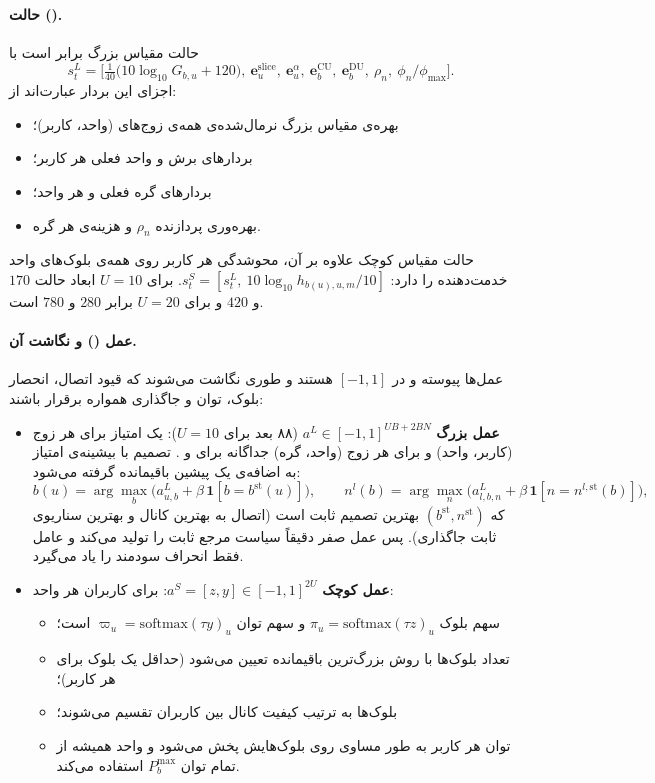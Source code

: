 \documentclass[12pt,oneside]{report}
\begin{document}
\paragraph{حالت ().}
حالت مقیاس بزرگ برابر است با
\begin{equation}\label{eq:sL}
	s^L_t=\Big[\tfrac{1}{40}\big(10\log_{10}G_{b,u}+120\big),\ \mathbf e^{\text{slice}}_u,\ \mathbf e^{\alpha}_u,\ \mathbf e^{\mathrm{CU}}_b,\ \mathbf e^{\mathrm{DU}}_b,\ \rho_n,\ \phi_n/\phi_{\max}\Big].
\end{equation}
اجزای این بردار عبارت‌اند از:
\begin{itemize}
	\item بهره‌ی مقیاس بزرگ نرمال‌شده‌ی همه‌ی زوج‌های (واحد، کاربر)؛
	\item بردارهای  برش و واحد فعلی هر کاربر؛
	\item بردارهای  گره فعلی  و  هر واحد؛
	\item بهره‌وری پردازنده $\rho_n$ و هزینه‌ی هر گره.
\end{itemize}
حالت مقیاس کوچک علاوه بر آن، محوشدگی هر کاربر روی همه‌ی بلوک‌های واحد خدمت‌دهنده را دارد: $s^S_t=[s^L_t,\ 10\log_{10}h_{b(u),u,m}/10]$. برای $U=10$ ابعاد حالت $170$ و $420$ و برای $U=20$ برابر $280$ و $780$ است.

\paragraph{عمل () و نگاشت آن.}
عمل‌ها پیوسته و در $[-1,1]$ هستند و طوری نگاشت می‌شوند که قیود اتصال، انحصار بلوک، توان و جاگذاری همواره برقرار باشند:
\begin{itemize}
	\item \textbf{عمل بزرگ} $a^L\in[-1,1]^{UB+2BN}$ (۸۸ بعد برای $U=10$): یک امتیاز برای هر زوج (کاربر، واحد) و برای هر زوج (واحد، گره) جداگانه برای  و . تصمیم با بیشینه‌ی امتیاز به اضافه‌ی یک پیشین باقیمانده گرفته می‌شود:
	\begin{equation}\label{eq:decL}
		b(u)=\arg\max_b\big(a^L_{u,b}+\beta\,\mathbf{1}[b=b^{\text{st}}(u)]\big),\qquad
		n^l(b)=\arg\max_n\big(a^L_{l,b,n}+\beta\,\mathbf{1}[n=n^{l,\text{st}}(b)]\big),
	\end{equation}
	که $(b^{\text{st}},n^{\text{st}})$ بهترین تصمیم ثابت است (اتصال به بهترین کانال و بهترین سناریوی ثابت جاگذاری). پس عمل صفر دقیقاً سیاست مرجع ثابت را تولید می‌کند و عامل فقط انحراف سودمند را یاد می‌گیرد.
	\item \textbf{عمل کوچک} $a^S=[z,y]\in[-1,1]^{2U}$: برای کاربران هر واحد:
	\begin{itemize}
		\item سهم بلوک $\pi_u=\mathrm{softmax}(\tau z)_u$ و سهم توان $\varpi_u=\mathrm{softmax}(\tau y)_u$ است؛
		\item تعداد بلوک‌ها با روش بزرگ‌ترین باقیمانده تعیین می‌شود (حداقل یک بلوک برای هر کاربر)؛
		\item بلوک‌ها به ترتیب کیفیت کانال بین کاربران تقسیم می‌شوند؛
		\item توان هر کاربر به طور مساوی روی بلوک‌هایش پخش می‌شود و واحد همیشه از تمام توان $P_b^{\max}$ استفاده می‌کند.
	\end{itemize}
\end{itemize}
\end{document}

